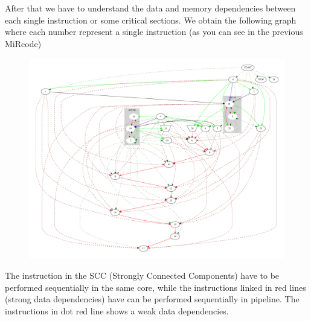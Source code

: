 After that we have to understand the data and memory dependencies between each single instruction or some critical sections.
We obtain the following graph where each number represent a single instruction (as you can see in the previous MiRcode)

\begin{figure}[h!]
	\centering
	\includegraphics[width=\textwidth]{imm/tessa/PDGscc.pdf} 	\caption{
	} 
	\label{pdg}
\end{figure}
The instruction in the SCC (Strongly Connected Components) have to be performed sequentially in the same core, while the instructions linked in red lines (strong data dependencies) have can be performed sequentially in pipeline. The instructions in dot red line shows a weak data dependencies.